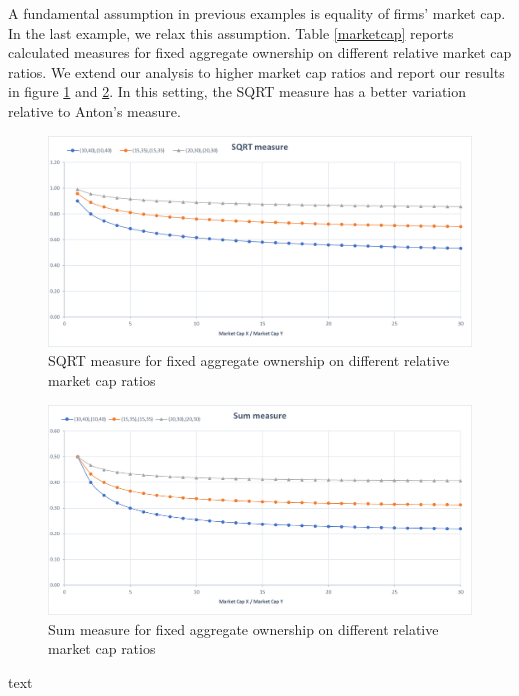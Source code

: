 \documentclass[12pt, a4paper]{article}
\begin{document}
A fundamental assumption in previous examples is equality of firms' market cap. In the last example, we relax this assumption. Table \ref{marketcap} reports calculated measures for fixed aggregate ownership on different relative market cap ratios. We extend our analysis to higher market cap ratios and report our results in figure \ref{sqrtMarket} and \ref{sumMarket}. In this setting, the SQRT measure has a better variation relative to Anton's measure. 






\begin{figure}[htbp]
	\centering
	\caption{ SQRT measure for fixed aggregate ownership on different relative market cap ratios}
	\label{sqrtMarket}
	\includegraphics[width=0.85\linewidth]{3.png}
\end{figure}

\begin{figure}[htbp]
	\centering
	\caption{ Sum measure for fixed aggregate ownership on different relative market cap ratios}
	\label{sumMarket}
	\includegraphics[width=0.85\linewidth]{4.png}
\end{figure}

\begin{table}[htbp]
	\centering
	\caption{text }
	\label{marketcap}
	\resizebox{!}{!}
	{
		
	}
\end{table}
\end{document}

